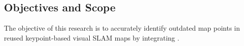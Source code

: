 \subsection{Objectives and Scope}
\label{objectives}

The objective of this research is to accurately identify outdated map points in reused keypoint-based visual SLAM maps by integrating . 